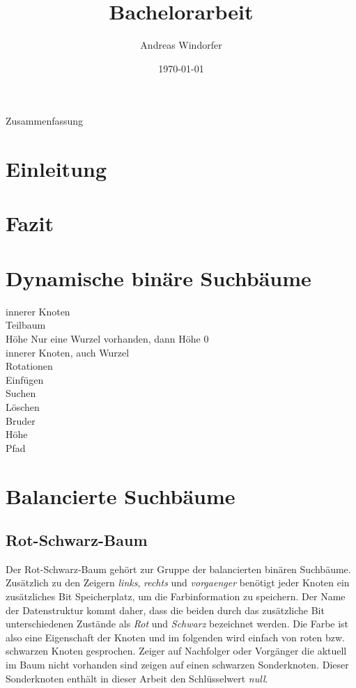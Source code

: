 \documentclass[a4paper,12pt]{article}
\title{Bachelorarbeit}
\author{

	Andreas Windorfer\\
}
\date{\today}
\begin{document}
\maketitle
\newpage
Zusammenfassung
\newpage
\tableofcontents


\newpage

\section {Einleitung}
\section{Fazit}
\section{Dynamische binäre Suchbäume}
innerer Knoten\\
Teilbaum\\
Höhe Nur eine Wurzel vorhanden, dann Höhe 0\\
innerer Knoten, auch Wurzel\\
Rotationen\\
Einfügen\\
Suchen\\
Löschen\\
Bruder\\
Höhe\\
Pfad\\
\section{Balancierte Suchbäume}
\subsection{Rot-Schwarz-Baum}
Der Rot-Schwarz-Baum gehört zur Gruppe der balancierten binären Suchbäume. Zusätzlich zu den Zeigern \textit{links}, \textit{rechts} und \textit{vorgaenger} benötigt jeder Knoten ein zusätzliches Bit Speicherplatz, um die Farbinformation zu speichern. Der Name der Datenstruktur kommt daher, dass die beiden durch das zusätzliche Bit unterschiedenen Zustände als \textit{Rot} und \textit{Schwarz} bezeichnet werden. Die Farbe ist also eine Eigenschaft der Knoten und im folgenden wird einfach von roten bzw. schwarzen Knoten gesprochen. Zeiger auf Nachfolger oder Vorgänger die aktuell im Baum nicht vorhanden sind zeigen auf einen schwarzen Sonderknoten. Dieser Sonderknoten enthält in dieser Arbeit den Schlüsselwert \textit{null}.  
\end{document}
